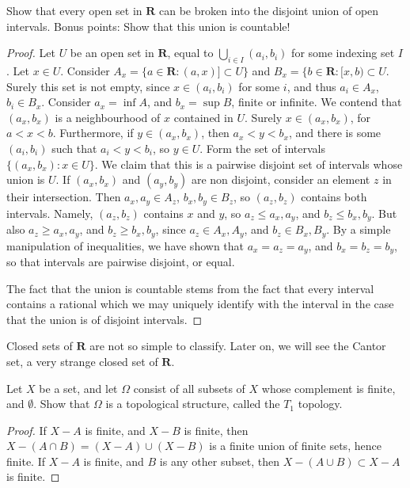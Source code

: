 \begin{exercise}
    Show that every open set in $\mathbf{R}$ can be broken into the disjoint union of open intervals. Bonus points: Show that this union is countable!
\end{exercise}
\begin{proof}
    Let $U$ be an open set in $\mathbf{R}$, equal to $\bigcup_{i \in I} (a_i, b_i)$ for some indexing set $I$. Let $x \in U$. Consider $A_x = \{ a \in \mathbf{R} : (a,x)] \subset U \}$ and $B_x = \{ b \in \mathbf{R} : [x,b) \subset U$. Surely this set is not empty, since $x \in (a_i, b_i)$ for some $i$, and thus $a_i \in A_x$, $b_i \in B_x$. Consider $a_x = \inf A$, and $b_x = \sup B$, finite or infinite. We contend that $(a_x,b_x)$ is a neighbourhood of $x$ contained in $U$. Surely $x \in (a_x,b_x)$, for $a < x < b$. Furthermore, if $y \in (a_x,b_x)$, then $a_x < y < b_x$, and there is some $(a_i, b_i)$ such that $a_i < y < b_i$, so $y \in U$. Form the set of intervals $\{ (a_x, b_x): x \in U\}$. We claim that this is a pairwise disjoint set of intervals whose union is $U$. If $(a_x, b_x)$ and $(a_y, b_y)$ are non disjoint, consider an element $z$ in their intersection. Then $a_x, a_y \in A_z$, $b_x, b_y \in B_z$, so $(a_z, b_z)$ contains both intervals. Namely, $(a_z, b_z)$ contains $x$ and $y$, so $a_z \leq a_x, a_y$, and $b_z \leq b_x, b_y$. But also $a_z \geq a_x, a_y$, and $b_z \geq b_x, b_y$, since $a_z \in A_x, A_y$, and $b_z \in B_x, B_y$. By a simple manipulation of inequalities, we have shown that $a_x = a_z = a_y$, and $b_x = b_z = b_y$, so that intervals are pairwise disjoint, or equal.

    The fact that the union is countable stems from the fact that every interval contains a rational which we may uniquely identify with the interval in the case that the union is of disjoint intervals.
\end{proof}

Closed sets of $\mathbf{R}$ are not so simple to classify. Later on, we will see the Cantor set, a very strange closed set of $\mathbf{R}$.

\begin{exercise}
    Let $X$ be a set, and let $\Omega$ consist of all subsets of $X$ whose complement is finite, and $\emptyset$. Show that $\Omega$ is a topological structure, called the $T_1$ topology.
\end{exercise}
\begin{proof}
    If $X - A$ is finite, and $X - B$ is finite, then $X - (A \cap B) = (X - A) \cup (X - B)$ is a finite union of finite sets, hence finite. If $X - A$ is finite, and $B$ is any other subset, then $X - (A \cup B) \subset X - A$ is finite.
\end{proof}


